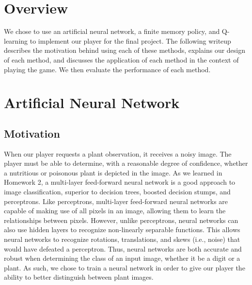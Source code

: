 \documentclass[solution, letterpaper]{cs121}
\begin{document}


\section*{Overview}
\hspace{4mm} We chose to use an artificial neural network, a finite memory policy, and Q-learning to implement our player for the final project. The following writeup describes the motivation behind using each of these methods, explains our design of each method, and discusses the application of each method in the context of playing the game. We then evaluate the performance of each method.

\section{Artificial Neural Network}
\subsection{Motivation}
\hspace{4mm} When our player requests a plant observation, it receives a noisy image. The player must be able to determine, with a reasonable degree of confidence, whether a nutritious or poisonous plant is depicted in the image. As we learned in Homework 2, a multi-layer feed-forward neural network is a good approach to image classification, superior to decision trees, boosted decision stumps, and perceptrons. Like perceptrons, multi-layer feed-forward neural networks are capable of making use of all pixels in an image, allowing them to learn the relationships between pixels. However, unlike perceptrons, neural networks can also use hidden layers to recognize non-linearly separable functions. This allows neural networks to recognize rotations, translations, and skews (i.e., noise) that would have defeated a perceptron. Thus, neural networks are both accurate and robust when determining the class of an input image, whether it be a digit or a plant. As such, we chose to train a neural network in order to give our player the ability to better distinguish between plant images.
\end{document}
